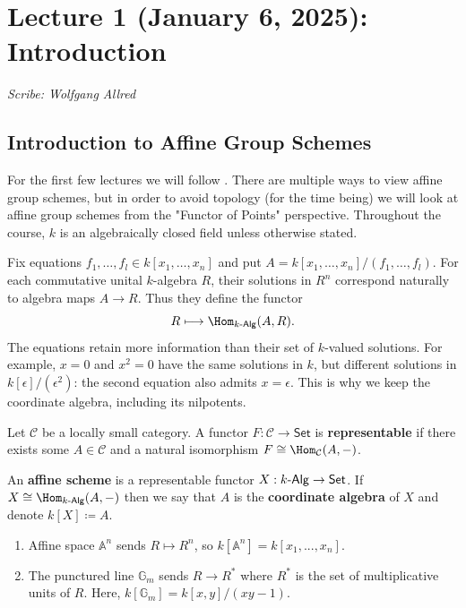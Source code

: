 \section{Lecture 1 (January 6, 2025): Introduction}\label{lec1}
\noindent\textit{Scribe: Wolfgang Allred}


\subsection*{Introduction to Affine Group Schemes}
For the first few lectures we will follow \cite{Wat}. There are multiple ways to view affine group schemes, but in order to avoid topology (for the time being) we will look at affine group schemes from the "Functor of Points" perspective. Throughout the course, $k$ is an algebraically closed field unless otherwise stated.

Fix equations $f_1,\ldots,f_l\in k[x_1,\ldots,x_n]$ and put
$A=k[x_1,\ldots,x_n]/(f_1,\ldots,f_l)$. For each commutative unital
$k$-algebra $R$, their solutions in $R^n$ correspond naturally to algebra maps
$A\to R$. Thus they define the functor
\[
 R\longmapsto\Hom_{k\text{-}\mathsf{Alg}}(A,R).
\]
The equations retain more information than their set of $k$-valued solutions.
For example, $x=0$ and $x^2=0$ have the same solutions in $k$, but different
solutions in $k[\epsilon]/(\epsilon^2)$: the second equation also admits $x=\epsilon$.
This is why we keep the coordinate algebra, including its nilpotents.

\begin{definition}
Let $\mathcal{C}$ be a locally small category. A functor $F: \mathcal{C} \to \mathsf{Set}$ is \textbf{representable} if there exists some $A \in \mathcal{C}$ and a natural isomorphism $F \cong \Hom_{\mathcal{C}}(A,-)$.

An \textbf{affine scheme} is a representable functor $X: k\text{-}\sf Alg \to Set$. If $X \cong \Hom_{k\text{-}{\sf Alg}}(A,-)$ then we say that $A$ is the \textbf{coordinate algebra} of $X$ and denote $k[X] \coloneqq A$.
\end{definition}

\begin{example}
\begin{enumerate}[1)]
	\item Affine space $\mathbb{A}^n$ sends $R \mapsto R^n$, so $k[\mathbb{A}^n] = k[x_1,...,x_n]$.
	\item The punctured line $\mathbb{G}_m$ sends $R \to R^*$ where $R^*$ is the set of multiplicative units of $R$. Here, $k[\mathbb{G}_m] = k[x,y]/(xy-1)$.
\end{enumerate}
\end{example}

